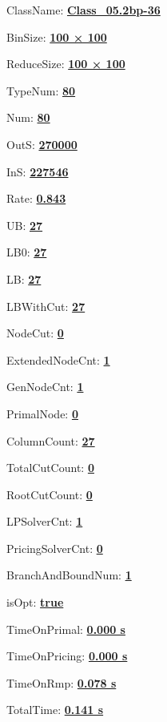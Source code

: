 \documentclass[11pt]{article}
\begin{document}
\pagestyle{empty}


ClassName: \underline{\textbf{Class_05.2bp-36}}
\par
BinSize: \underline{\textbf{100 × 100}}
\par
ReduceSize: \underline{\textbf{100 × 100}}
\par
TypeNum: \underline{\textbf{80}}
\par
Num: \underline{\textbf{80}}
\par
OutS: \underline{\textbf{270000}}
\par
InS: \underline{\textbf{227546}}
\par
Rate: \underline{\textbf{0.843}}
\par
UB: \underline{\textbf{27}}
\par
LB0: \underline{\textbf{27}}
\par
LB: \underline{\textbf{27}}
\par
LBWithCut: \underline{\textbf{27}}
\par
NodeCut: \underline{\textbf{0}}
\par
ExtendedNodeCnt: \underline{\textbf{1}}
\par
GenNodeCnt: \underline{\textbf{1}}
\par
PrimalNode: \underline{\textbf{0}}
\par
ColumnCount: \underline{\textbf{27}}
\par
TotalCutCount: \underline{\textbf{0}}
\par
RootCutCount: \underline{\textbf{0}}
\par
LPSolverCnt: \underline{\textbf{1}}
\par
PricingSolverCnt: \underline{\textbf{0}}
\par
BranchAndBoundNum: \underline{\textbf{1}}
\par
isOpt: \underline{\textbf{true}}
\par
TimeOnPrimal: \underline{\textbf{0.000 s}}
\par
TimeOnPricing: \underline{\textbf{0.000 s}}
\par
TimeOnRmp: \underline{\textbf{0.078 s}}
\par
TotalTime: \underline{\textbf{0.141 s}}
\par
\newpage


\end{document}
